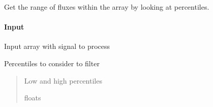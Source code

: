 \documentclass[letterpaper,10pt,english]{sphinxmanual}
\begin{document}
\begin{fulllineitems}
\label{\detokenize{api/pymusepipe:pymusepipe.util_image.get_flux_range}}
\pysigstartsignatures
{}
\pysigstopsignatures
\sphinxAtStartPar
Get the range of fluxes within the array
by looking at percentiles.


\paragraph{Input}
\label{\detokenize{api/pymusepipe:id148}}\begin{description}
\sphinxAtStartPar
Input array with signal to process

\sphinxAtStartPar
Percentiles to consider to filter

\end{description}
\begin{quote}\begin{description}
\sphinxAtStartPar
{} \textendash{} Low and high percentiles

 floats

\end{description}\end{quote}

\end{fulllineitems}

\end{document}
